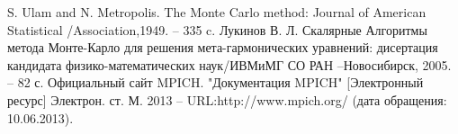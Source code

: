 \newpage
\begin{thebibliography}{99} 
		S. Ulam and N. Metropolis. The Monte Carlo method: Journal of American Statistical /Association,1949. -- 335 c.
	 Лукинов В. Л. Скалярные Алгоритмы метода Монте-Карло для решения мета-гармонических уравнений: дисертация кандидата физико-математических наук/ИВМиМГ СО РАН --Новосибирск, 2005. -- 82 с.
	Официальный сайт MPICH. "Документация MPICH" [Электронный ресурс] Электрон. ст. М. 2013 – URL:http://www.mpich.org/ (дата обращения: 10.06.2013).
\end{thebibliography}

